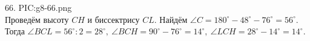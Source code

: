 66. {{PIC:g8-66.png}}\\
Проведём высоту $CH$ и биссектрису $CL.$ Найдём $\angle C=180^\circ-48^\circ-76^\circ=56^\circ.$ Тогда $\angle BCL=56^\circ:2=28^\circ,\ \angle BCH=90^\circ-76^\circ=14^\circ,\ \angle LCH=28^\circ-14^\circ=14^\circ.$\\
